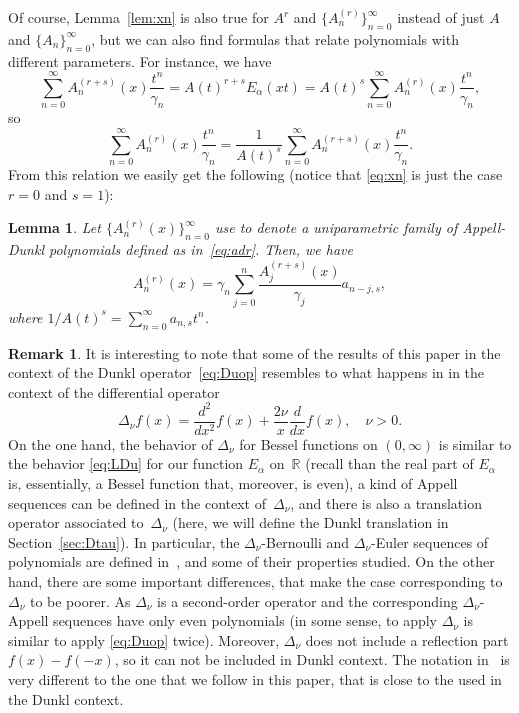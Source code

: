 \documentclass[10pt]{article}
\theoremstyle{plain}
\newtheorem{lemma}[theorem]{Lemma}
\theoremstyle{definition}
\newtheorem{remark}{Remark}
\numberwithin{equation}{section} %
\newcommand{\Ea}{E_{\alpha}}
\newcommand{\RR}{\mathbb{R}}
\newcommand{\cc}{\gamma}
\begin{document}
Of course, Lemma~\ref{lem:xn} is also true for $A^r$ and $\{A_{n}^{(r)}\}_{n=0}^{\infty}$ instead of just $A$ and $\{A_{n}\}_{n=0}^{\infty}$, but we can also find formulas that relate polynomials with different parameters. For instance, we have
\begin{equation*}
  \sum_{n=0}^{\infty} A_{n}^{(r+s)}(x) \frac{t^n}{\cc_n} = A(t)^{r+s} \Ea(xt) 
  = A(t)^s \sum_{n=0}^{\infty} A_{n}^{(r)}(x) \frac{t^n}{\cc_n},
\end{equation*}
so
\begin{equation*}
  \sum_{n=0}^{\infty} A_{n}^{(r)}(x) \frac{t^n}{\cc_n} 
  = \frac{1}{A(t)^s} \sum_{n=0}^{\infty} A_{n}^{(r+s)}(x) \frac{t^n}{\cc_n}.
\end{equation*}
From this relation we easily get the following (notice that \eqref{eq:xn} is just the case $r=0$ and $s=1$):

\begin{lemma}
Let $\{A_n^{(r)}(x)\}_{n=0}^{\infty}$ use to denote a uniparametric family of Appell-Dunkl polynomials defined as in~\eqref{eq:adr}. 
Then, we have
\[
  A_n^{(r)}(x) = \cc_n\sum_{j=0}^n \frac{A_j^{(r+s)}(x)}{\cc_j}a_{n-j,s},
\]
where ${1}/{A(t)^s} = \sum_{n=0}^\infty a_{n,s}t^n$.
\end{lemma}

\begin{remark}
\label{rem:Cho}
It is interesting to note that some of the results of this paper in the context of the Dunkl operator~\eqref{eq:Duop} resembles to what happens in \cite{Cho} in the context of the differential operator
\[
  \Delta_\nu f(x) = \frac{d^2}{dx^2}f(x) + \frac{2\nu}{x} \frac{d}{dx}f(x),\quad \nu>0.
\]
On the one hand, the behavior of $\Delta_\nu$ for Bessel functions on $(0,\infty)$ is similar to the behavior \eqref{eq:LDu} for our function $\Ea$ on~$\RR$ (recall than the real part of $\Ea$ is, essentially, a Bessel function that, moreover, is even), a kind of Appell sequences can be defined in the context of~$\Delta_\nu$, and there is also a translation operator associated to~$\Delta_\nu$ (here, we will define the Dunkl translation in Section~\ref{sec:Dtau}).
In particular, the $\Delta_\nu$-Bernoulli and $\Delta_\nu$-Euler sequences of polynomials are defined in~\cite{Cho}, and some of their properties studied. On the other hand, there are some important differences, that make the case corresponding to $\Delta_\nu$ to be poorer. As $\Delta_\nu$ is a second-order operator and the corresponding $\Delta_\nu$-Appell sequences have only even polynomials (in some sense, to apply $\Delta_\nu$ is similar to apply \eqref{eq:Duop} twice). Moreover, $\Delta_\nu$ does not include a reflection part $f(x)-f(-x)$, so it can not be included in Dunkl context. The notation in~\cite{Cho} is very different to the one that we follow in this paper, that is close to the used in the Dunkl context.
\end{remark}
\end{document}
